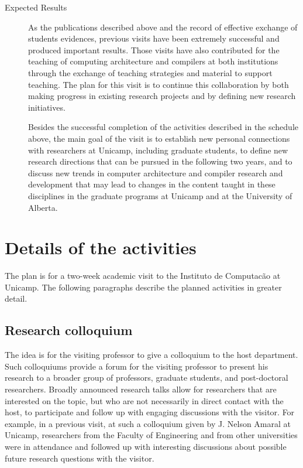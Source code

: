 \documentclass[10pt]{article}
\begin{document}
\begin{description}
\item[Expected Results]

As the publications described above and the record of effective exchange of students evidences, previous visits have been extremely successful and produced important results. Those visits have also contributed for the teaching of computing architecture and compilers at both institutions through the exchange of teaching strategies and material to support teaching. The plan for this visit is to continue this collaboration by both making progress in existing research projects and by defining new research initiatives. 

Besides the successful completion of the activities described in the schedule above, the main goal of the visit is to establish new personal connections with researchers at Unicamp, including graduate students, to define new research directions that can be pursued in the following two years, and to discuss new trends in computer architecture and compiler research and development that may lead to changes in the content taught in these disciplines in the graduate programs at Unicamp and at the University of Alberta.

\end{description}

\section{Details of the activities} \label{activities}

The plan is for a two-week academic visit to the Instituto de Computac\~ao at Unicamp. The following paragraphs describe the planned activities in greater detail.

\subsection{Research colloquium}

The idea is for the visiting professor to give a colloquium to the host department.  Such colloquiums provide a forum for the visiting professor to present his research to a broader group of professors, graduate students, and post-doctoral researchers. Broadly announced research talks allow for researchers that are interested on the topic, but who are not necessarily in direct contact with the host, to participate and follow up with engaging discussions with the visitor. For example, in a previous visit, at such a colloquium given by J. Nelson Amaral at Unicamp, researchers from the Faculty of Engineering and from other universities were in attendance and followed up with interesting discussions about possible future research questions with the visitor.
\end{document}
